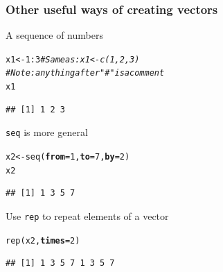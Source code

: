 \documentclass[color=usenames,dvipsnames]{beamer}\usepackage[]{graphicx}\usepackage[]{color}
\makeatletter
\newcommand{\hlnum}[1]{\textcolor[rgb]{0.69,0.494,0}{#1}}%
\newcommand{\hlcom}[1]{\textcolor[rgb]{0.514,0.506,0.514}{\textit{#1}}}%
\newcommand{\hlopt}[1]{\textcolor[rgb]{0,0,0}{#1}}%
\newcommand{\hlstd}[1]{\textcolor[rgb]{0,0,0}{#1}}%
\newcommand{\hlkwb}[1]{\textcolor[rgb]{0,0.341,0.682}{#1}}%
\newcommand{\hlkwc}[1]{\textcolor[rgb]{0,0,0}{\textbf{#1}}}%
\newcommand{\hlkwd}[1]{\textcolor[rgb]{0.004,0.004,0.506}{#1}}%
\newenvironment{kframe}{%
 \def\at@end@of@kframe{}%
 \ifinner\ifhmode%
  \def\at@end@of@kframe{\end{minipage}}%
  \begin{minipage}{\columnwidth}%
 \fi\fi%
 \def\FrameCommand##1{\hskip\@totalleftmargin \hskip-\fboxsep
 \colorbox{shadecolor}{##1}\hskip-\fboxsep
     \hskip-\linewidth \hskip-\@totalleftmargin \hskip\columnwidth}%
 \MakeFramed {\advance\hsize-\width
   \@totalleftmargin\z@ \linewidth\hsize
   \@setminipage}}%
 {\par\unskip\endMakeFramed%
 \at@end@of@kframe}
\newenvironment{knitrout}{}{} %
\newcommand{\inr}[1]{\colorbox{inlinecolor}{\texttt{#1}}}
\makeatother
\begin{document}


%


\begin{frame}[fragile]
  \frametitle{Other useful ways of creating vectors}
A sequence of numbers
\begin{knitrout}\small
{}\color{fgcolor}\begin{kframe}
\begin{alltt}
\hlstd{x1} \hlkwb{<-} \hlnum{1}\hlopt{:}\hlnum{3} \hlcom{# Same as: x1 <- c(1, 2, 3)}
          \hlcom{# Note: anything after "#" is a comment}
\hlstd{x1}
\end{alltt}
\begin{verbatim}
## [1] 1 2 3
\end{verbatim}
\end{kframe}
\end{knitrout}
\pause \vfill
\inr{seq} is more general
\begin{knitrout}\small
{}\color{fgcolor}\begin{kframe}
\begin{alltt}
\hlstd{x2} \hlkwb{<-} \hlkwd{seq}\hlstd{(}\hlkwc{from}\hlstd{=}\hlnum{1}\hlstd{,} \hlkwc{to}\hlstd{=}\hlnum{7}\hlstd{,} \hlkwc{by}\hlstd{=}\hlnum{2}\hlstd{)}
\hlstd{x2}
\end{alltt}
\begin{verbatim}
## [1] 1 3 5 7
\end{verbatim}
\end{kframe}
\end{knitrout}
\pause \vfill
Use \inr{rep} to repeat elements of a vector
\begin{knitrout}\small
{}\color{fgcolor}\begin{kframe}
\begin{alltt}
\hlkwd{rep}\hlstd{(x2,} \hlkwc{times}\hlstd{=}\hlnum{2}\hlstd{)}
\end{alltt}
\begin{verbatim}
## [1] 1 3 5 7 1 3 5 7
\end{verbatim}
\end{kframe}
\end{knitrout}
\end{frame}
\end{document}
